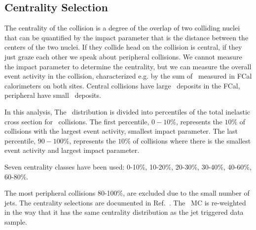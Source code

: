 \subsection{Centrality Selection}
\label{sec:cent}

The centrality of the collision is a degree of the overlap of two colliding nuclei that can be quantified by the impact parameter that is the distance between the centers of the two nuclei.
If they collide head on the collision is central, if they just graze each other we speak about peripheral collisions.
We cannot measure the impact parameter to determine the centrality, but we can measure the overall event activity in the collision, characterized e.g.
by the sum of \Et\ measured in FCal calorimeters on both sites.
Central collisions have large \Et\ deposits in the FCal, peripheral have small \Et\ deposits.

In this analysis, The \ETfcal\ distribution is divided into percentiles of the total inelastic cross section for \PbPb\ collisions.
The first percentile, $0-10\%$, represents the $10\%$ of collisions with the largest event activity, smallest impact parameter.
The last percentile, $90-100\%$, represents the $10\%$ of collisions where there is the smallest event activity and largest impact parameter.

Seven centrality classes have been used: 0-10\%, 10-20\%, 20-30\%, 30-40\%, 40-60\%, 60-80\%.

The most peripheral collisions 80-100\%, are excluded due to  the small number of jets.
The centrality selections are documented in Ref.~\cite{ref:centrality}.
The \PbPb\ MC is re-weighted in the way that it has the same centrality distribution as the jet triggered data sample.
